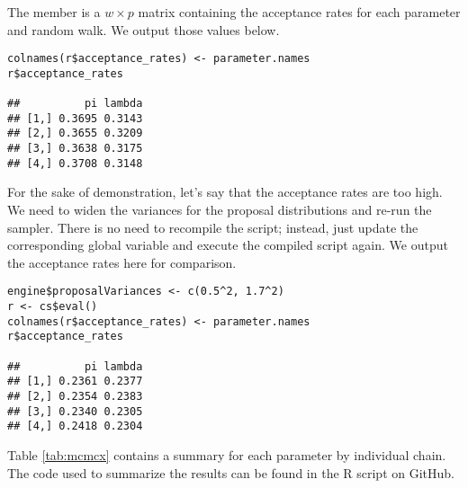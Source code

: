 The  member is a $w \times p$ matrix containing the acceptance rates for each parameter and random walk. We output those values below.

\begin{verbatim}
colnames(r$acceptance_rates) <- parameter.names
r$acceptance_rates

##          pi lambda
## [1,] 0.3695 0.3143
## [2,] 0.3655 0.3209
## [3,] 0.3638 0.3175
## [4,] 0.3708 0.3148
\end{verbatim}

For the sake of demonstration, let's say that the acceptance rates are too high. We need to widen the variances for the proposal distributions and re-run the sampler. There is no need to recompile the script; instead, just update the corresponding global variable and execute the compiled script again. We output the acceptance rates here for comparison.

\begin{verbatim}
engine$proposalVariances <- c(0.5^2, 1.7^2)
r <- cs$eval()
colnames(r$acceptance_rates) <- parameter.names
r$acceptance_rates

##          pi lambda
## [1,] 0.2361 0.2377
## [2,] 0.2354 0.2383
## [3,] 0.2340 0.2305
## [4,] 0.2418 0.2304
\end{verbatim}

Table \ref{tab:mcmcx} contains a summary for each parameter by individual chain. The code used to summarize the results can be found in the R script  on GitHub.

